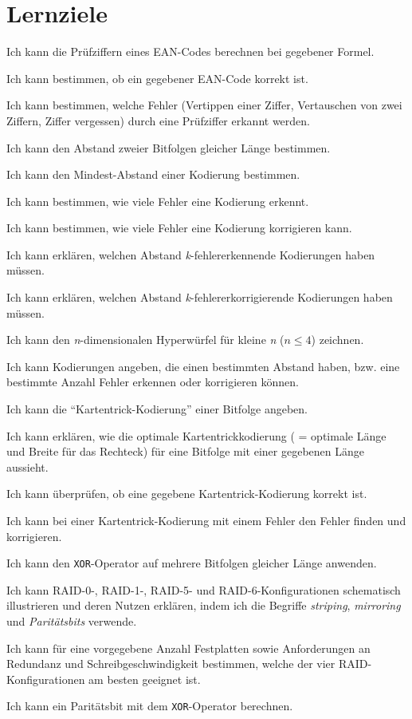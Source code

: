 \chapter{Lernziele}
\begin{todolist}
    \item Ich kann die Prüfziffern eines \gls{EAN}-Codes berechnen bei gegebener Formel.
    \item Ich kann bestimmen, ob ein gegebener \gls{EAN}-Code korrekt ist.
    \item Ich kann bestimmen, welche Fehler (Vertippen einer Ziffer, Vertauschen von zwei Ziffern, Ziffer vergessen) durch eine Prüfziffer erkannt werden.
    \item Ich kann den Abstand zweier Bitfolgen gleicher Länge bestimmen.
    \item Ich kann den Mindest-Abstand einer Kodierung bestimmen.
    \item Ich kann bestimmen, wie viele Fehler eine Kodierung erkennt.
    \item Ich kann bestimmen, wie viele Fehler eine Kodierung korrigieren kann.
    \item Ich kann erklären, welchen Abstand \textit{k}-fehlererkennende Kodierungen haben müssen.
    \item Ich kann erklären, welchen Abstand \textit{k}-fehlererkorrigierende Kodierungen haben müssen.
    \item Ich kann den \textit{n}-dimensionalen Hyperwürfel für kleine \textit{n} ($n\leq 4$) zeichnen.
    \item Ich kann Kodierungen angeben, die einen bestimmten Abstand haben, bzw. eine bestimmte Anzahl Fehler erkennen oder korrigieren können.
    \item Ich kann die \enquote{Kartentrick-Kodierung} einer Bitfolge angeben.
    \item Ich kann erklären, wie die optimale Kartentrickkodierung ( = optimale Länge und Breite für das Rechteck) für eine Bitfolge mit einer gegebenen Länge aussieht.
    \item Ich kann überprüfen, ob eine gegebene Kartentrick-Kodierung korrekt ist.
    \item Ich kann bei einer Kartentrick-Kodierung mit einem Fehler den Fehler finden und korrigieren.
    \item Ich kann den \texttt{XOR}-Operator auf mehrere Bitfolgen gleicher Länge anwenden.
    \item Ich kann \gls{RAID}-0-, \gls{RAID}-1-, \gls{RAID}-5- und \gls{RAID}-6-Konfigurationen schematisch illustrieren und deren Nutzen erklären, indem ich die Begriffe \textit{striping}, \textit{mirroring} und \textit{Paritätsbits} verwende.
    \item Ich kann für eine vorgegebene Anzahl Festplatten sowie Anforderungen an Redundanz und Schreibgeschwindigkeit bestimmen, welche der vier \gls{RAID}-Konfigurationen am besten geeignet ist.
    \item Ich kann ein Paritätsbit mit dem \texttt{XOR}-Operator berechnen.
\end{todolist}
